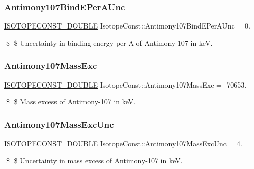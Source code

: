 \subsubsection{\texorpdfstring{Antimony107\+Bind\+E\+Per\+A\+Unc}{Antimony107BindEPerAUnc}}
{\footnotesize\ttfamily \mbox{\hyperlink{group___isotope_const-_macros_ga8f45a7272ce02c0b4c65c44636ed719a}{I\+S\+O\+T\+O\+P\+E\+C\+O\+N\+S\+T\+\_\+\+D\+O\+U\+B\+LE}} Isotope\+Const\+::\+Antimony107\+Bind\+E\+Per\+A\+Unc = 0.}

\$ \$ Uncertainty in binding energy per A of Antimony-\/107 in keV. \mbox{\label{group___isotope_const-_antimony-_sb107_ga7affb356e597bdfa05ffe8e77a4ad812}} 
\subsubsection{\texorpdfstring{Antimony107\+Mass\+Exc}{Antimony107MassExc}}
{\footnotesize\ttfamily \mbox{\hyperlink{group___isotope_const-_macros_ga8f45a7272ce02c0b4c65c44636ed719a}{I\+S\+O\+T\+O\+P\+E\+C\+O\+N\+S\+T\+\_\+\+D\+O\+U\+B\+LE}} Isotope\+Const\+::\+Antimony107\+Mass\+Exc = -\/70653.}

\$ \$ Mass excess of Antimony-\/107 in keV. \mbox{\label{group___isotope_const-_antimony-_sb107_gaf8156b80879f896886e7417eea97f6b7}} 
\subsubsection{\texorpdfstring{Antimony107\+Mass\+Exc\+Unc}{Antimony107MassExcUnc}}
{\footnotesize\ttfamily \mbox{\hyperlink{group___isotope_const-_macros_ga8f45a7272ce02c0b4c65c44636ed719a}{I\+S\+O\+T\+O\+P\+E\+C\+O\+N\+S\+T\+\_\+\+D\+O\+U\+B\+LE}} Isotope\+Const\+::\+Antimony107\+Mass\+Exc\+Unc = 4.}

\$ \$ Uncertainty in mass excess of Antimony-\/107 in keV. \mbox{\label{group___isotope_const-_antimony-_sb107_ga582073be020caad768c0e952518c7037}} 
